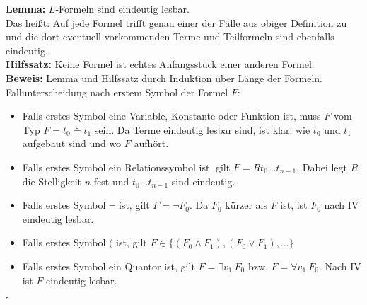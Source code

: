 \documentclass[a4paper]{scrartcl}
\begin{document}
\textbf{Lemma:} $L$-Formeln sind eindeutig lesbar.\\
Das heißt: Auf jede Formel trifft genau einer der Fälle aus obiger Definition zu und die dort eventuell vorkommenden Terme und Teilformeln sind ebenfalls eindeutig.\smallskip\\
\textbf{Hilfssatz:} Keine Formel ist echtes Anfangsstück einer anderen Formel.\medskip\\
\textbf{Beweis:} Lemma und Hilfssatz durch Induktion über Länge der Formeln.\\
Fallunterscheidung nach erstem Symbol der Formel $F$:
\begin{itemize}
\item Falls erstes Symbol eine Variable, Konstante oder Funktion ist, muss $F$ vom Typ $F= t_0 \circeq t_1$ sein. Da Terme eindeutig lesbar sind, ist klar, wie $t_0$ und $t_1$ aufgebaut sind und wo $F$ aufhört.
\item Falls erstes Symbol ein Relationssymbol ist, gilt $F=Rt_0 \dots t_{n-1}$. Dabei legt $R$ die Stelligkeit $n$ fest und $t_0 \dots t_{n-1}$ sind eindeutig.
\item Falls erstes Symbol $\lnot$ ist, gilt $F= \lnot F_0$. Da $F_0$ kürzer als $F$ ist, ist $F_0$ nach IV eindeutig lesbar.
\item Falls erstes Symbol $($ ist, gilt $F \in \{(F_0 \land F_1),(F_0 \lor F_1),\dots\}$
\item Falls erstes Symbol ein Quantor ist, gilt $F=\exists v_1\ F_0$ bzw. $F=\forall v_1\ F_0$. Nach IV ist $F$ eindeutig lesbar.
\end{itemize}
$\square$
\end{document}
